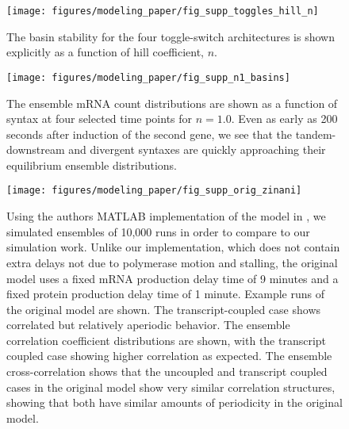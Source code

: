 \documentclass[11pt]{article}
\begin{document}
\begin{figure}[hbtp]
    \centering
    {\texttt{[image: figures/modeling\_paper/fig\_supp\_toggles\_hill\_n]}
    }
    \caption{The basin stability for the four toggle-switch architectures is shown explicitly as a function of hill coefficient, \(n\).}
    \label{fig:supp:toggles_hill_n_sweep}
\end{figure}


\begin{figure}[hbtp]
    \centering
    \texttt{[image: figures/modeling\_paper/fig\_supp\_n1\_basins]}
    \caption{The ensemble mRNA count distributions are shown as a function of syntax at four selected time points for \(n = 1.0\). Even as early as 200 seconds after induction of the second gene, we see that the tandem-downstream and divergent syntaxes are quickly approaching their equilibrium ensemble distributions.}
    \label{fig:supp:n1_toggle_distributions}
\end{figure}

\begin{figure}[hbtp]
    \centering
    {\texttt{[image: figures/modeling\_paper/fig\_supp\_orig\_zinani]}
    \label{fig:supp:zinani_matlab_mRNA}
    \label{fig:supp:zinani_matlab_correlation}
    \label{fig:supp:zinani_matlab_cross_correlation}
    }
    \caption{Using the authors MATLAB implementation of the model in \textcite{zinaniPairingSegmentationClock2021}, we simulated ensembles of 10,000 runs in order to compare to our simulation work. Unlike our implementation, which does not contain extra delays not due to polymerase motion and stalling, the original model uses a fixed mRNA production delay time of 9 minutes and a fixed protein production delay time of 1 minute.
         Example runs of the original model are shown. The transcript-coupled case shows correlated but relatively aperiodic behavior.
         The ensemble correlation coefficient distributions are shown, with the transcript coupled case showing higher correlation as expected.
         The ensemble cross-correlation shows that the uncoupled and transcript coupled cases in the original model show very similar correlation structures, showing that both have similar amounts of periodicity in the original model.
    }
    \label{fig:top:zinani_matlab}
\end{figure}
\end{document}
